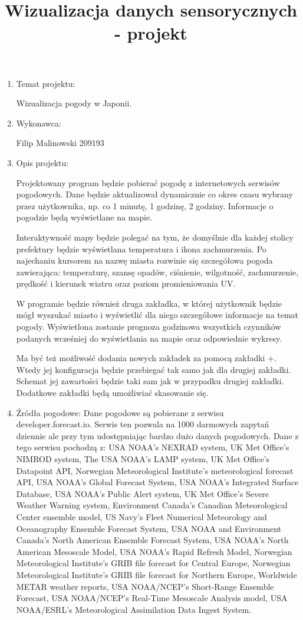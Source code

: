 \documentclass[a4paper]{article}
\title{Wizualizacja danych sensorycznych - projekt}
\date{}
\begin{document}
\maketitle

\begin{enumerate}

\item Temat projektu:

Wizualizacja pogody w Japonii.

\item Wykonawca:

Filip Malinowski 209193

\item Opis projektu:

Projektowany program będzie pobierać pogodę z internetowych serwisów pogodowych. Dane będzie aktualizował dynamicznie co okres czasu wybrany przez użytkownika, np. co 1 minutę, 1 godzinę, 2 godziny. Informacje o pogodzie będą wyświetlane na mapie.

Interaktywność mapy będzie polegać na tym, że domyślnie dla każdej stolicy prefektury będzie wyświetlana temperatura i ikona zachmurzenia. Po najechaniu kursorem na nazwę miasta rozwinie się szczegółowa pogoda zawierająca: temperaturę, szansę opadów, ciśnienie, wilgotność, zachmurzenie, prędkość i kierunek wiatru oraz poziom promieniowania UV.

W programie będzie również druga zakładka, w której użytkownik będzie mógł wyszukać miasto i wyświetlić dla niego szczegółowe informacje na temat pogody. Wyświetlona zostanie prognoza godzinowa wszystkich czynników podanych wcześniej do wyświetlania na mapie oraz odpowiednie wykresy.

Ma być też możliwość dodania nowych zakładek za pomocą zakładki +. Wtedy jej konfiguracja będzie przebiegać tak samo jak dla drugiej zakładki. Schemat jej zawartości będzie taki sam jak w przypadku drugiej zakładki. Dodatkowe zakładki będą umożliwiać skasowanie się.

\item Źródła pogodowe:
Dane pogodowe są pobierane z serwisu developer.forecast.io. Serwis ten pozwala na 1000 darmowych zapytań dziennie ale przy tym udostępniając bardzo dużo danych pogodowych. Dane z tego serwisu pochodzą z: USA NOAA’s NEXRAD system, UK Met Office’s NIMROD system, The USA NOAA’s LAMP system, UK Met Office’s Datapoint API, Norwegian Meteorological Institute’s meteorological forecast API, USA NOAA’s Global Forecast System, USA NOAA’s Integrated Surface Database, USA NOAA’s Public Alert system, UK Met Office’s Severe Weather Warning system, Environment Canada’s Canadian Meteorological Center ensemble model, US Navy’s Fleet Numerical Meteorology and Oceanography Ensemble Forecast System, USA NOAA and Environment Canada’s North American Ensemble Forecast System, USA NOAA’s North American Mesoscale Model, USA NOAA’s Rapid Refresh Model, Norwegian Meteorological Institute’s GRIB file forecast for Central Europe, Norwegian Meteorological Institute’s GRIB file forecast for Northern Europe, Worldwide METAR weather reports, USA NOAA/NCEP’s Short-Range Ensemble Forecast, USA NOAA/NCEP’s Real-Time Mesoscale Analysis model, USA NOAA/ESRL’s Meteorological Assimilation Data Ingest System.


\end{enumerate}
\end{document}
